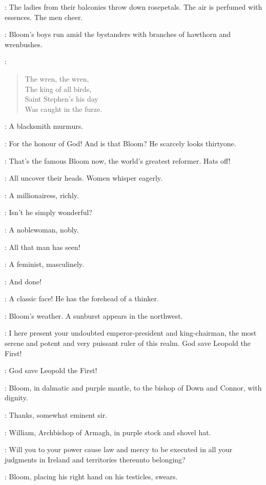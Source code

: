 :
The ladies from their balconies throw down rosepetals.
The air is perfumed with essences.
The men cheer.

:
Bloom's boys run amid the bystanders with branches of hawthorn and wrenbushes.

\BloomsBoys:
\begin{verse}
    The wren,
the wren,\\
    The king of all birds,\\
    Saint Stephen's his day\\
    Was caught in the furze.
\end{verse}

:
A blacksmith murmurs.

\Blacksmith:
For the honour of God!
And is that Bloom?
He scarcely looks thirtyone.

\Flagger[1]:
That's the famous Bloom now,
the world's greatest reformer.
Hats off!

:
All uncover their heads.
Women whisper eagerly.

:
A millionairess,
richly.

\Millionairess:
Isn't he simply wonderful?

:
A noblewoman,
nobly.

\Noblewoman:
All that man has seen!

:
A feminist,
masculinely.

\Feminist:
And done!

\Bellhanger[2]:
A classic face!
He has the forehead of a thinker.

:
Bloom's weather.
A sunburst appears in the northwest.

\DownConnor[2]:
I here present your undoubted emperor-president and king-chairman,
the most serene and potent and very puissant ruler of this realm.
God save Leopold the First!

\All:
God save Leopold the First!

:
Bloom,
in dalmatic and purple mantle,
to the bishop of Down and Connor,
with dignity.

\Bloom:
Thanks,
somewhat eminent sir.

:
William,
Archbishop of Armagh,
in purple stock and shovel hat.

\WillArmagh:
Will you to your power cause law and mercy to be executed
in all your judgments in Ireland and territories thereunto belonging?

:
Bloom,
placing his right hand on his testicles,
swears.

